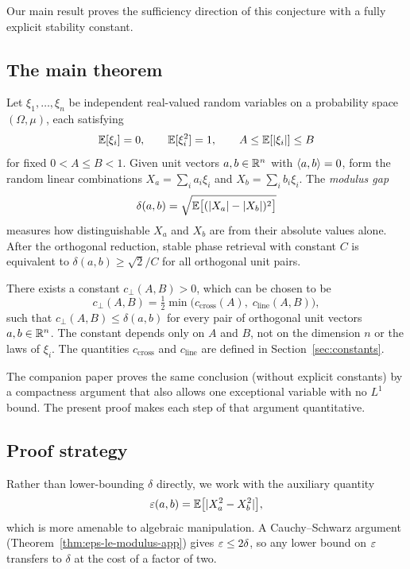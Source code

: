 Our main result proves the sufficiency direction of this conjecture with
a fully explicit stability constant.

\subsection{The main theorem}

Let $\xi_1, \dots, \xi_n$ be independent real-valued random variables on a
probability space $(\Omega, \mu)$, each satisfying
\[
\mathbb{E}[\xi_i] = 0,
\qquad
\mathbb{E}[\xi_i^2] = 1,
\qquad
A \le \mathbb{E}[\lvert \xi_i \rvert] \le B
\]
for fixed $0 < A \le B < 1$. Given unit vectors $a, b \in \mathbb{R}^n$ with
$\langle a,b\rangle = 0$, form the random linear combinations
$X_a = \sum_i a_i \xi_i$ and $X_b = \sum_i b_i \xi_i$. The \emph{modulus gap}
\[
\delta(a,b) = \sqrt{\mathbb{E}\bigl[(\lvert X_a \rvert - \lvert X_b \rvert)^2\bigr]}
\]
measures how distinguishable $X_a$ and $X_b$ are from their absolute values
alone. After the orthogonal reduction, stable phase retrieval with constant $C$
is equivalent to $\delta(a,b) \ge \sqrt{2}/C$ for all orthogonal unit pairs.

\begin{theorem}\label{thm:main}
There exists a constant $c_\perp(A,B) > 0$, which can be chosen to be
\[
c_\perp(A,B)
= \tfrac{1}{2}
  \min\bigl(c_{\mathrm{cross}}(A),\;
  c_{\mathrm{line}}(A,B)\bigr),
\]
such that $c_\perp(A,B) \le \delta(a,b)$
for every pair of orthogonal unit vectors $a, b \in \mathbb{R}^n$.
The constant depends only on $A$ and $B$, not on the dimension $n$ or the
laws of $\xi_i$. The quantities $c_{\mathrm{cross}}$ and
$c_{\mathrm{line}}$ are defined in Section~\ref{sec:constants}.
\end{theorem}

\begin{remark}
The companion paper \cite{compactness} proves the same conclusion (without
explicit constants) by a compactness argument that also allows one
exceptional variable with no $L^1$ bound. The present proof makes each step
of that argument quantitative.
\end{remark}

\subsection{Proof strategy}\label{sec:strategy}

Rather than lower-bounding $\delta$ directly, we work with the auxiliary
quantity
\[
\varepsilon(a,b) = \mathbb{E}\bigl[\lvert X_a^2 - X_b^2 \rvert\bigr],
\]
which is more amenable to algebraic manipulation. A Cauchy--Schwarz argument
(Theorem~\ref{thm:eps-le-modulus-app}) gives $\varepsilon \le 2\delta$, so any lower
bound on $\varepsilon$ transfers to $\delta$ at the cost of a factor of two.

